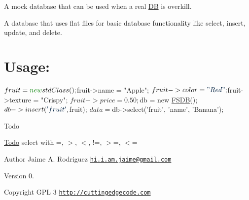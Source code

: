 A mock database that can be used when a real \hyperlink{class_d_b}{D\-B} is overkill.

A database that uses flat files for basic database functionality like select, insert, update, and delete.\hypertarget{robo1_usage}{}\section{Usage\-:}\label{robo1_usage}

\begin{DoxyCode}
$fruit = \textcolor{keyword}{new} stdClass();
$fruit->name = \textcolor{stringliteral}{"Apple"};
$fruit->color = \textcolor{stringliteral}{"Red"};
$fruit->texture = \textcolor{stringliteral}{"Crispy"};
$fruit->price = 0.50;

$db = \textcolor{keyword}{new} \hyperlink{class_f_s_d_b}{FSDB}();
$db->insert(\textcolor{stringliteral}{'fruit'}, $fruit);
$data = $db->select(\textcolor{stringliteral}{'fruit'}, \textcolor{stringliteral}{'name'}, \textcolor{stringliteral}{'Banana'});
\end{DoxyCode}


\begin{DoxyRefDesc}{Todo}
\item[\hyperlink{todo__todo000002}{Todo}]select with =, $>$, $<$, !=, $>$=, $<$= \end{DoxyRefDesc}
\begin{DoxyAuthor}{Author}
Jaime A. Rodriguez \href{mailto:hi.i.am.jaime@gmail.com}{\tt hi.\-i.\-am.\-jaime@gmail.\-com} 
\end{DoxyAuthor}
\begin{DoxyVersion}{Version}
0. 
\end{DoxyVersion}
\begin{DoxyCopyright}{Copyright}
G\-P\-L 3 \href{http://cuttingedgecode.com}{\tt http\-://cuttingedgecode.\-com} 
\end{DoxyCopyright}
